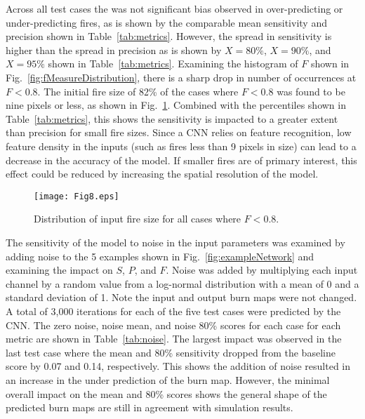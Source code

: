 \documentclass[smallcondensed]{svjour3}     %
\begin{document}
Across all test cases the was not significant bias
observed in over-predicting or under-predicting fires, as is shown by the
comparable mean sensitivity and precision shown in Table~\ref{tab:metrics}.
However, the spread in sensitivity is higher than the spread in precision
as is shown by $X=80\%$, $X=90\%$, and $X=95\%$ shown in Table~\ref{tab:metrics}.
Examining the histogram of $F$ shown in Fig.~\ref{fig:fMeasureDistribution},
there is a sharp drop in number of occurrences at $F < 0.8$.
The initial fire size of 82\% of the cases where $F < 0.8$ was found to be
nine pixels or less, as shown in Fig.~\ref{fig:fireSize}.
Combined with the percentiles shown in Table~\ref{tab:metrics}, this shows
the sensitivity is impacted to a greater extent than precision for small fire
sizes. Since a CNN relies on feature recognition, low feature density in
the inputs (such as fires less than 9 pixels in size) can lead to a decrease
in the accuracy of the model. If smaller fires are of primary interest,
this effect could be reduced by increasing the spatial resolution of the model.

\begin{figure}[htbp]
\centering
  \texttt{[image: Fig8.eps]}
\caption{Distribution of input fire size for all cases where $F < 0.8$.}
\label{fig:fireSize}       %
\end{figure}

The sensitivity of the model to noise in the input parameters was examined
by adding noise to the 5 examples shown in Fig.~\ref{fig:exampleNetwork}
and examining the impact on $S$, $P$, and $F$. Noise was added by multiplying
each input channel by a random value from a log-normal distribution with a
mean of 0 and a standard deviation of 1. Note the input and output burn maps
were not changed. A total of 3,000 iterations for each of the five test
cases were predicted by the CNN. The zero noise, noise mean, and noise 80\%
scores for each case for each metric are shown in Table~\ref{tab:noise}.
The largest impact was observed in the last test case where the mean and 80\%
sensitivity dropped from the baseline score by 0.07 and 0.14,
respectively. This shows the addition of noise resulted in an increase in
the under prediction of the burn map.
However, the minimal overall impact on the mean and 80\% scores
shows the general shape of the predicted burn maps are still in agreement
with simulation results.
\end{document}
